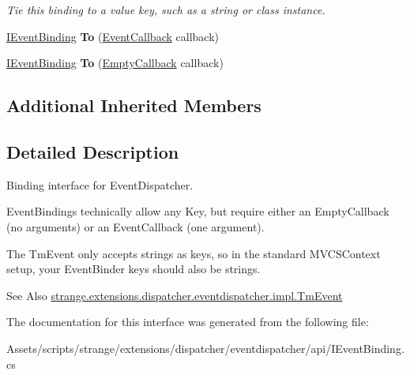 \begin{DoxyCompactItemize}
\begin{DoxyCompactList}\small\item\em Tie this binding to a value key, such as a string or class instance. \end{DoxyCompactList}\item 
\hypertarget{interfacestrange_1_1extensions_1_1dispatcher_1_1eventdispatcher_1_1api_1_1_i_event_binding_aa3ea162300b1c274476c5f89c3ddbecb}{\hyperlink{interfacestrange_1_1extensions_1_1dispatcher_1_1eventdispatcher_1_1api_1_1_i_event_binding}{I\-Event\-Binding} {\bfseries To} (\hyperlink{namespacestrange_1_1extensions_1_1dispatcher_1_1eventdispatcher_1_1api_a5b2a372c9c074884178eb4a32992afd3}{Event\-Callback} callback)}\label{interfacestrange_1_1extensions_1_1dispatcher_1_1eventdispatcher_1_1api_1_1_i_event_binding_aa3ea162300b1c274476c5f89c3ddbecb}

\item 
\hypertarget{interfacestrange_1_1extensions_1_1dispatcher_1_1eventdispatcher_1_1api_1_1_i_event_binding_a57463800a377374ccab15f11e0500457}{\hyperlink{interfacestrange_1_1extensions_1_1dispatcher_1_1eventdispatcher_1_1api_1_1_i_event_binding}{I\-Event\-Binding} {\bfseries To} (\hyperlink{namespacestrange_1_1extensions_1_1dispatcher_1_1eventdispatcher_1_1api_a4d68e68b31e6e0f733bd72ddcd6111fa}{Empty\-Callback} callback)}\label{interfacestrange_1_1extensions_1_1dispatcher_1_1eventdispatcher_1_1api_1_1_i_event_binding_a57463800a377374ccab15f11e0500457}

\end{DoxyCompactItemize}
\subsection*{Additional Inherited Members}


\subsection{Detailed Description}
Binding interface for Event\-Dispatcher. 

Event\-Bindings technically allow any Key, but require either an Empty\-Callback (no arguments) or an Event\-Callback (one argument).

The Tm\-Event only accepts strings as keys, so in the standard M\-V\-C\-S\-Context setup, your Event\-Binder keys should also be strings.

\begin{DoxySeeAlso}{See Also}
\hyperlink{classstrange_1_1extensions_1_1dispatcher_1_1eventdispatcher_1_1impl_1_1_tm_event}{strange.\-extensions.\-dispatcher.\-eventdispatcher.\-impl.\-Tm\-Event} 
\end{DoxySeeAlso}


The documentation for this interface was generated from the following file\-:\begin{DoxyCompactItemize}
\item 
Assets/scripts/strange/extensions/dispatcher/eventdispatcher/api/I\-Event\-Binding.\-cs\end{DoxyCompactItemize}
